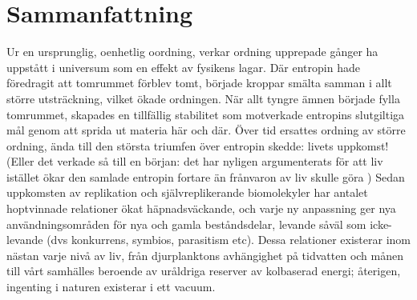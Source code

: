 


\chapter{Sammanfattning}
Ur en ursprunglig, oenhetlig oordning, verkar ordning upprepade gånger ha uppstått i universum som en effekt av fysikens lagar. Där entropin hade föredragit att tomrummet förblev tomt, började kroppar smälta samman i allt större utsträckning, vilket ökade ordningen. När allt tyngre ämnen började fylla tomrummet, skapades en tillfällig stabilitet som motverkade entropins slutgiltiga mål genom att sprida ut materia här och där. Över tid ersattes ordning av större ordning, ända till den största triumfen över entropin skedde: livets uppkomst! (Eller det verkade så till en början: det har nyligen argumenterats för att liv istället ökar den samlade entropin fortare än frånvaron av liv skulle göra \citep{england2013statistical}) Sedan uppkomsten av replikation och självreplikerande biomolekyler har antalet hoptvinnade relationer ökat häpnadsväckande, och varje ny anpassning ger nya användningsområden för nya och gamla beståndsdelar, levande såväl som icke-levande (dvs konkurrens, symbios, parasitism etc). Dessa relationer existerar inom nästan varje nivå av liv, från djurplanktons avhängighet på tidvatten och månen till vårt samhälles beroende av uråldriga reserver av kolbaserad energi; återigen, ingenting i naturen existerar i ett vacuum.



